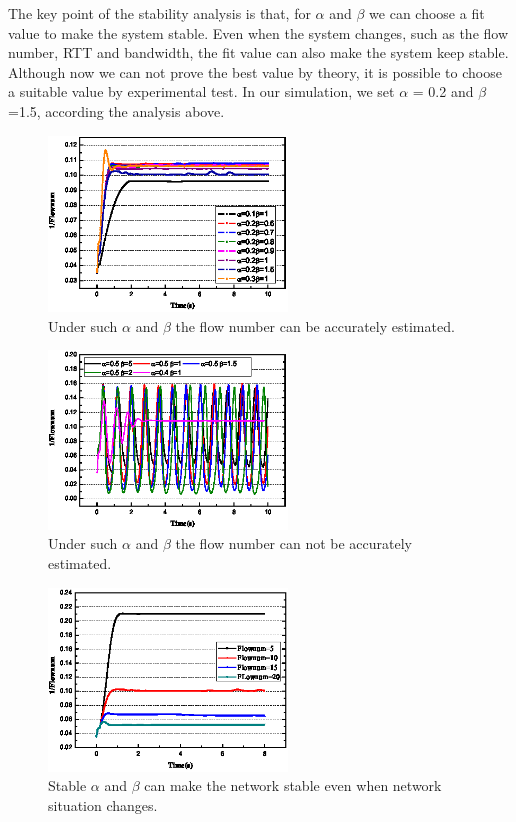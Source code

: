 The key point of the stability analysis is that, for $\alpha$ and $\beta$ we can choose a fit value to make the system stable. Even when the system changes, such as the flow number, RTT and bandwidth, the fit value can also make the system keep stable. Although now we can not prove the best value by theory, it is possible to choose a suitable value by experimental test. In our simulation, we set $\alpha$ = 0.2 and $\beta$ =1.5, according the analysis above.
\begin{figure}[t]
\centering
\includegraphics[width=2.5in]{ab-pic-cut.eps}
\centering
\caption{Under such $\alpha$ and $\beta$ the flow number can be accurately estimated.}
\label{fig-ab}
\end{figure}
\begin{figure}[t]
\centering
\includegraphics[width=2.5in]{abwrong-pic-cut.eps}
\centering
\caption{Under such $\alpha$ and $\beta$ the flow number can not be accurately estimated.}
\label{fig-abwrong}
\end{figure}
\begin{figure}[t]
\centering
\includegraphics[width=2.5in]{abflownum-pic-cut.eps}
\centering
\caption{Stable $\alpha$ and $\beta$ can make the network stable even when network situation changes.}
\label{fig-abflownum}
\end{figure}


